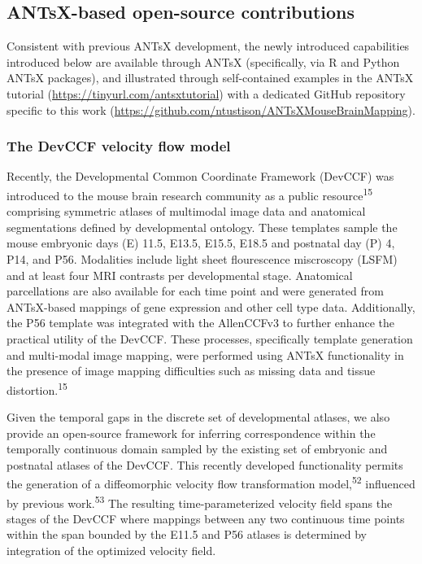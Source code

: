 \documentclass[
  12pt,
]{article}
\begin{document}
\hypertarget{antsx-based-open-source-contributions}{%
\subsection{ANTsX-based open-source
contributions}\label{antsx-based-open-source-contributions}}

Consistent with previous ANTsX development, the newly introduced
capabilities introduced below are available through ANTsX (specifically,
via R and Python ANTsX packages), and illustrated through self-contained
examples in the ANTsX tutorial (\url{https://tinyurl.com/antsxtutorial})
with a dedicated GitHub repository specific to this work
(\url{https://github.com/ntustison/ANTsXMouseBrainMapping}).

\hypertarget{the-devccf-velocity-flow-model}{%
\subsubsection{The DevCCF velocity flow
model}\label{the-devccf-velocity-flow-model}}

Recently, the Developmental Common Coordinate Framework (DevCCF) was
introduced to the mouse brain research community as a public
resource\textsuperscript{15} comprising symmetric atlases of multimodal
image data and anatomical segmentations defined by developmental
ontology. These templates sample the mouse embryonic days (E) 11.5,
E13.5, E15.5, E18.5 and postnatal day (P) 4, P14, and P56. Modalities
include light sheet flourescence miscroscopy (LSFM) and at least four
MRI contrasts per developmental stage. Anatomical parcellations are also
available for each time point and were generated from ANTsX-based
mappings of gene expression and other cell type data. Additionally, the
P56 template was integrated with the AllenCCFv3 to further enhance the
practical utility of the DevCCF. These processes, specifically template
generation and multi-modal image mapping, were performed using ANTsX
functionality in the presence of image mapping difficulties such as
missing data and tissue distortion.\textsuperscript{15}

Given the temporal gaps in the discrete set of developmental atlases, we
also provide an open-source framework for inferring correspondence
within the temporally continuous domain sampled by the existing set of
embryonic and postnatal atlases of the DevCCF. This recently developed
functionality permits the generation of a diffeomorphic velocity flow
transformation model,\textsuperscript{52} influenced by previous
work.\textsuperscript{53} The resulting time-parameterized velocity
field spans the stages of the DevCCF where mappings between any two
continuous time points within the span bounded by the E11.5 and P56
atlases is determined by integration of the optimized velocity field.
\end{document}
